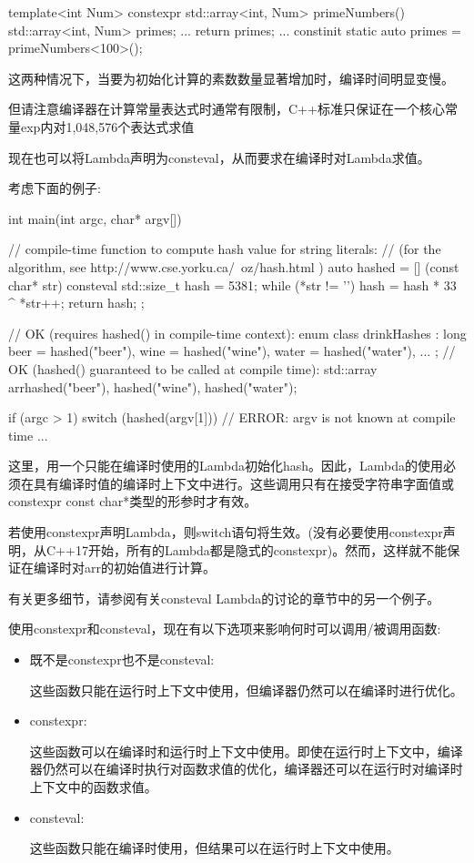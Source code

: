 \begin{cpp}
template<int Num>
constexpr
std::array<int, Num> primeNumbers()
{
	std::array<int, Num> primes;
	...
	return primes;
}
...
constinit static auto primes = primeNumbers<100>();
\end{cpp}

这两种情况下，当要为初始化计算的素数数量显著增加时，编译时间明显变慢。

但请注意编译器在计算常量表达式时通常有限制，C++标准只保证在一个核心常量exp内对1,048,576个表达式求值



现在也可以将Lambda声明为consteval，从而要求在编译时对Lambda求值。

考虑下面的例子:

\begin{cpp}
int main(int argc, char* argv[])
{
	// compile-time function to compute hash value for string literals:
	// (for the algorithm, see http://www.cse.yorku.ca/~oz/hash.html )
	auto hashed = [] (const char* str) consteval {
					std::size_t hash = 5381;
					while (*str != '\0') {
						hash = hash * 33 ^ *str++;
					}
					return hash;
				};

	// OK (requires hashed() in compile-time context):
	enum class drinkHashes : long { beer = hashed("beer"), wine = hashed("wine"),
									water = hashed("water"), ... };
	// OK (hashed() guaranteed to be called at compile time):
	std::array arr{hashed("beer"), hashed("wine"), hashed("water")};

	if (argc > 1) {
		switch (hashed(argv[1])) { // ERROR: argv is not known at compile time
			...
		}
	}
}
\end{cpp}

这里，用一个只能在编译时使用的Lambda初始化hash。因此，Lambda的使用必须在具有编译时值的编译时上下文中进行。这些调用只有在接受字符串字面值或constexpr const char*类型的形参时才有效。

若使用constexpr声明Lambda，则switch语句将生效。(没有必要使用constexpr声明，从C++17开始，所有的Lambda都是隐式的constexpr)。然而，这样就不能保证在编译时对arr的初始值进行计算。

有关更多细节，请参阅有关consteval Lambda的讨论的章节中的另一个例子。


使用constexpr和consteval，现在有以下选项来影响何时可以调用/被调用函数:

\begin{itemize}
\item
既不是constexpr也不是consteval:

这些函数只能在运行时上下文中使用，但编译器仍然可以在编译时进行优化。

\item
constexpr:

这些函数可以在编译时和运行时上下文中使用。即使在运行时上下文中，编译器仍然可以在编译时执行对函数求值的优化，编译器还可以在运行时对编译时上下文中的函数求值。

\item
consteval:

这些函数只能在编译时使用，但结果可以在运行时上下文中使用。
\end{itemize}

